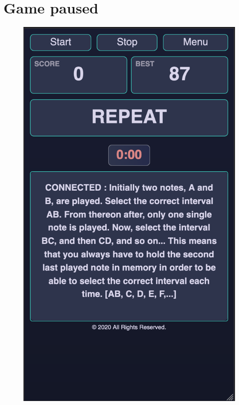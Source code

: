 \section{Game paused}
\begin{figure}[H]
\centering
\includegraphics[scale=.33]{Parts/Fig/gamestopped.png}
\vspace*{-5mm}
\end{figure}


